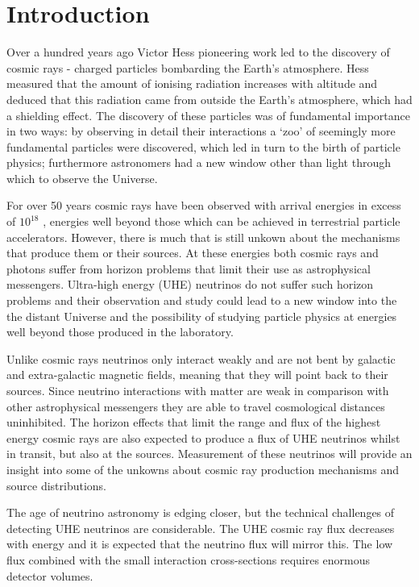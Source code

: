 \chapter{Introduction}
\label{chap:introduction}

Over a hundred years ago Victor Hess pioneering work led to the discovery of cosmic rays - charged particles bombarding the Earth's atmosphere. Hess measured that the amount of ionising radiation increases with altitude and deduced that this radiation came from outside the Earth's atmosphere, which had a shielding effect. The discovery of these particles was of fundamental importance in two ways: by observing in detail their interactions a `zoo' of seemingly more fundamental particles were discovered, which led in turn to the birth of particle physics; furthermore astronomers had a new window other than light through which to observe the Universe.

For over 50 years cosmic rays have been observed with arrival energies in excess of $10^{18}$ \eV, energies well beyond those which can be achieved in terrestrial particle accelerators. However, there is much that is still unkown about the mechanisms that produce them or their sources. At these energies both cosmic rays and photons suffer from horizon problems that limit their use as astrophysical messengers. Ultra-high energy (UHE) neutrinos do not suffer such horizon problems and their observation and study could lead to a new window into the the distant Universe and the possibility of studying particle physics at energies well beyond those produced in the laboratory. 

Unlike cosmic rays neutrinos only interact weakly and are not bent by galactic and extra-galactic magnetic fields, meaning that they will point back to their sources. Since neutrino interactions with matter are weak in comparison with other astrophysical messengers they are able to travel cosmological distances uninhibited. The horizon effects that limit the range and flux of the highest energy cosmic rays are also expected to produce a flux of UHE neutrinos whilst in transit, but also at the sources. Measurement of these neutrinos will provide an insight into some of the unkowns about cosmic ray production mechanisms and source distributions.

The age of neutrino astronomy is edging closer, but the technical challenges of detecting UHE neutrinos are considerable. The UHE cosmic ray flux decreases with energy and it is expected that the neutrino flux will mirror this. The low flux combined with the small interaction cross-sections requires enormous detector volumes.

